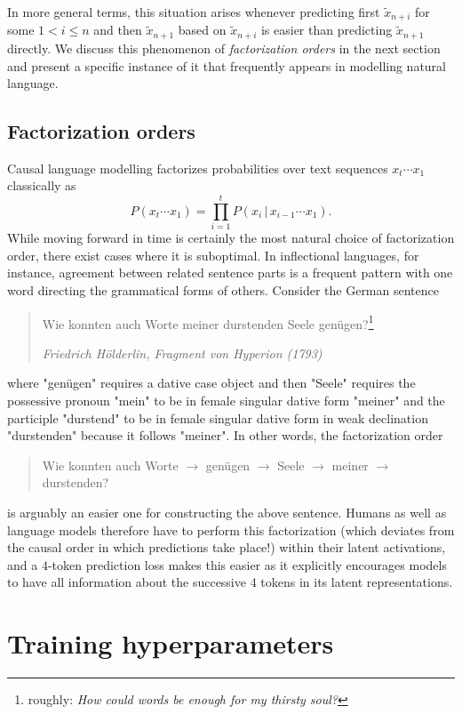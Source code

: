 In more general terms, this situation arises whenever predicting first $\tilde{x}_{n+i}$ for some $ 1 < i \leq n$ and then $\tilde{x}_{n+1}$ based on $\tilde{x}_{n+i}$ is easier than predicting $\tilde{x}_{n+1}$ directly. We discuss this phenomenon of \emph{factorization orders} in the next section and present a specific instance of it that frequently appears in modelling natural language.

\subsection{Factorization orders}
Causal language modelling factorizes probabilities over text sequences $x_t \cdots x_1$ classically as 
\[ P(x_t \cdots x_1) = \prod_{i=1}^t P(x_i \,|\, x_{i-1} \cdots x_1). \]
While moving forward in time is certainly the most natural choice of factorization order, there exist cases where it is suboptimal. In inflectional languages, for instance, agreement between related sentence parts is a frequent pattern with one word directing the grammatical forms of others. Consider the German sentence
\begin{quote}
Wie konnten auch Worte meiner durstenden Seele genügen?\footnote{roughly: \textit{How could words be enough for my thirsty soul?}}
\par\noindent\hfill\textit{Friedrich Hölderlin, Fragment von Hyperion (1793)}
\end{quote}
where "genügen" requires a dative case object and then "Seele" requires the possessive pronoun "mein" to be in female singular dative form "meiner" and the participle "durstend" to be in female singular dative form in weak declination "durstenden" because it follows "meiner". In other words, the factorization order
\begin{quote}
Wie konnten auch Worte $\rightarrow$ genügen $\rightarrow$ Seele $\rightarrow$ meiner $\rightarrow$ durstenden?
\end{quote}
is arguably an easier one for constructing the above sentence. Humans as well as language models therefore have to perform this factorization (which deviates from the causal order in which predictions take place!) within their latent activations, and a $4$-token prediction loss makes this easier as it explicitly encourages models to have all information about the successive 4 tokens in its latent representations.

\newpage
\section{Training hyperparameters}


